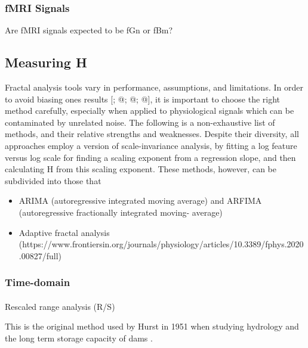 \documentclass[
  sn-vancouver,
  Numbered,
  referee,
  lineno]{sn-jnl}
\makeatletter
\let\oldparagraph\paragraph
\renewcommand{\paragraph}{
    \@ifstar
      \xxxParagraphStar
      \xxxParagraphNoStar
  }
\newcommand{\xxxParagraphStar}[1]{\oldparagraph*{#1}\mbox{}}
\newcommand{\xxxParagraphNoStar}[1]{\oldparagraph{#1}\mbox{}}
\providecommand{\tightlist}{%
  \setlength{\itemsep}{0pt}\setlength{\parskip}{0pt}}\usepackage{longtable,booktabs,array}
\makeatother
\begin{document}
\subsubsection{fMRI Signals}\label{fmri-signals}

Are fMRI signals expected to be fGn or fBm?

\subsection{Measuring H}\label{measuring-h}

Fractal analysis tools vary in performance, assumptions, and
limitations. In order to avoid biasing ones results
{[}\citet{bassingthwaighteEvaluatingRescaledRange1994}; @; @; @{]}, it
is important to choose the right method carefully, especially when
applied to physiological signals which can be contaminated by unrelated
noise. The following is a non-exhaustive list of methods, and their
relative strengths and weaknesses. Despite their diversity, all
approaches employ a version of scale-invariance analysis, by fitting a
log feature versus log scale for finding a scaling exponent from a
regression slope, and then calculating H from this scaling exponent.
These methods, however, can be subdivided into those that

\begin{itemize}
\tightlist
\item
  ARIMA (autoregressive integrated moving average) and ARFIMA
  (autoregressive fractionally integrated moving- average)
\item
  Adaptive fractal analysis
  (https://www.frontiersin.org/journals/physiology/articles/10.3389/fphys.2020.00827/full)
\end{itemize}

\subsubsection{Time-domain}\label{time-domain}

\paragraph{Rescaled range analysis
(R/S)}\label{rescaled-range-analysis-rs}

This is the original method used by Hurst in 1951 when studying
hydrology and the long term storage capacity of dams
\citep{hurstLongTermStorageCapacity1951}.

\citet{dongHurstExponentAnalysis2018}
\end{document}

